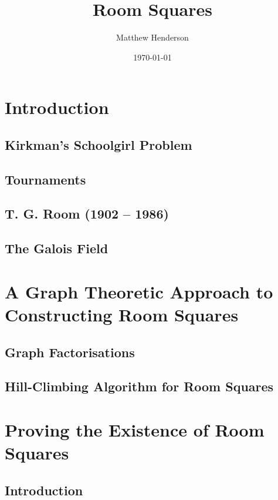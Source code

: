 \documentclass[a4paper, draft]{book}
\title{Room Squares}
\author{Matthew Henderson}
\date{\today}
\begin{document}
\frontmatter
\maketitle
\tableofcontents

\mainmatter

\chapter{Introduction}
\label{ch:introduction}

\section{Kirkman’s Schoolgirl Problem}
  
\section{Tournaments}
  
\section{T. G. Room (1902 -- 1986)}
  
\section{The Galois Field}
  

\chapter{A Graph Theoretic Approach to Constructing Room Squares}
\label{ch:graph-theoretic}

\section{Graph Factorisations}
  
\section{Hill-Climbing Algorithm for Room Squares}
  

\chapter{Proving the Existence of Room Squares}
\label{ch:existence-proof}

\section{Introduction}
  
\end{document}
